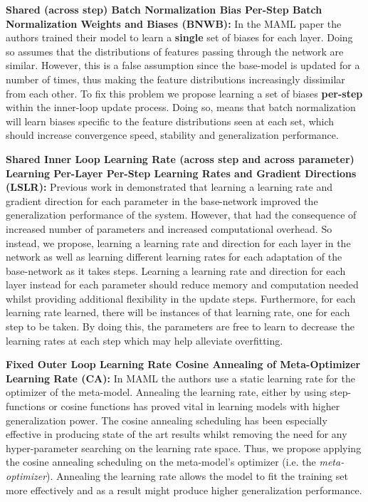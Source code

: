 \documentclass{article} \usepackage[dvipsnames]{xcolor}
\begin{document}
\textbf{Shared (across step) Batch Normalization Bias  Per-Step Batch Normalization Weights and Biases (BNWB):} In the MAML paper the authors trained their model to learn a \textbf{single} set of biases for each layer. Doing so assumes that the distributions of features passing through the network are similar. However, this is a false assumption since the base-model is updated for a number of times, thus making the feature distributions increasingly dissimilar from each other. To fix this problem we propose learning a set of biases \textbf{per-step} within the inner-loop update process. Doing so, means that batch normalization will learn biases specific to the feature distributions seen at each set, which should increase convergence speed, stability and generalization performance.

\textbf{Shared Inner Loop Learning Rate (across step and across parameter)  Learning Per-Layer Per-Step Learning Rates and Gradient Directions (LSLR):} Previous work in \cite{li2017meta} demonstrated that learning a learning rate and gradient direction for each parameter in the base-network improved the generalization performance of the system. However, that had the consequence of increased number of parameters and increased computational overhead. So instead, we propose, learning a learning rate and direction for each layer in the network as well as learning different learning rates for each adaptation of the base-network as it takes steps. Learning a learning rate and direction for each layer instead for each parameter should reduce memory and computation needed whilst providing additional flexibility in the update steps. Furthermore, for each learning rate learned, there will be  instances of that learning rate, one for each step to be taken. By doing this, the parameters are free to learn to decrease the learning rates at each step which may help alleviate overfitting.

\textbf{Fixed Outer Loop Learning Rate  Cosine Annealing of Meta-Optimizer Learning Rate (CA):} In MAML the authors use a static learning rate for the optimizer of the meta-model. Annealing the learning rate, either by using step-functions \citep{he2016deep} or cosine functions \citep{loshchilov2016sgdr} has proved vital in learning models with higher generalization power. The cosine annealing scheduling has been especially effective in producing state of the art results whilst removing the need for any hyper-parameter searching on the learning rate space. Thus, we propose applying the cosine annealing scheduling on the meta-model's optimizer (i.e. the \emph{meta-optimizer}). Annealing the learning rate allows the model to fit the training set more effectively and as a result might produce higher generalization performance.
\end{document}
